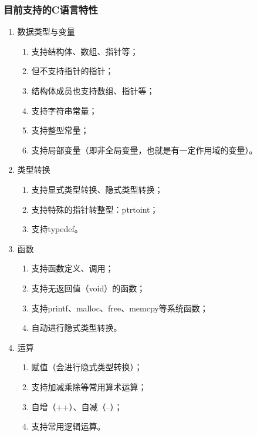 \documentclass[a4paper]{article}
\begin{document}
\begin{CJK*}{UTF8}{gbsn}
    \subsubsection{目前支持的C语言特性}
    \begin{enumerate}
        \item 数据类型与变量
        \begin{enumerate}
            \item 支持结构体、数组、指针等；
            \item 但不支持指针的指针；
            \item 结构体成员也支持数组、指针等；
            \item 支持字符串常量；
            \item 支持整型常量；
            \item 支持局部变量（即非全局变量，也就是有一定作用域的变量）。
        \end{enumerate}
        
        \item 类型转换
        \begin{enumerate}
            \item 支持显式类型转换、隐式类型转换；
            \item 支持特殊的指针转整型：ptrtoint；
            \item 支持typedef。
        \end{enumerate}
        
        \item 函数
        \begin{enumerate}
            \item 支持函数定义、调用；
            \item 支持无返回值（void）的函数；
            \item 支持printf、malloc、free、memcpy等系统函数；
            \item 自动进行隐式类型转换。
        \end{enumerate}
        
        \item 运算
        \begin{enumerate}
            \item 赋值（会进行隐式类型转换）；
            \item 支持加减乘除等常用算术运算；
            \item 自增（++）、自减（--）；
            \item 支持常用逻辑运算。
        \end{enumerate}


\end{enumerate}
\end{CJK*}
\end{document}
